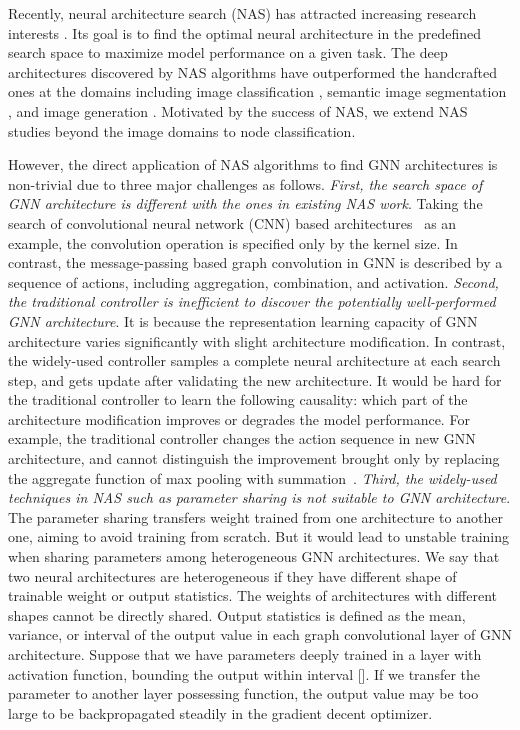 \documentclass[sigconf]{acmart}
\begin{document}
Recently, neural architecture search (NAS) has attracted increasing research interests \cite{elsken2018neural}. Its goal is to find the optimal neural architecture in the predefined search space to maximize model performance on a given task. The deep architectures discovered by NAS algorithms have outperformed the handcrafted ones at the domains including image classification \cite{zoph2016neural, zoph2018learning, liu2017hierarchical, pham2018efficient, jin2018auto, luo2018neural, liu2018progressive, liu2018darts, xie2019exploring, kandasamy2018neural}, semantic image segmentation \cite{liu2019auto}, and image generation \cite{wang2019agan}. Motivated by the success of NAS, we extend NAS studies beyond the image domains to node classification.


However, the direct application of NAS algorithms to find GNN architectures is non-trivial due to three major challenges as follows. {\textit{First, the search space of GNN architecture is different with the ones in existing NAS work}}.
Taking the search of convolutional neural network (CNN) based architectures~\cite{zoph2016neural} as an example, the convolution operation is specified only by the kernel size. In contrast, the message-passing based graph convolution in GNN is described by a sequence of actions, including aggregation, combination, and activation. 
{\textit{Second, the traditional controller is inefficient to discover the potentially well-performed GNN architecture}}. It is because the representation learning capacity of GNN architecture varies significantly with slight architecture modification. In contrast, the widely-used controller samples a complete neural architecture at each search step, and gets update after validating the new architecture. It would be hard for the traditional controller to learn the following causality: which part of the architecture modification improves or degrades the model performance. 
For example, the traditional controller changes the action sequence in new GNN architecture, and cannot distinguish the improvement brought only by replacing the aggregate function of max pooling with summation~\cite{howpowerful}.
{\textit{Third, the widely-used techniques in NAS such as parameter sharing is not suitable to GNN architecture}}. The parameter sharing transfers weight trained from one architecture to another one, aiming to avoid training from scratch. But it would lead to unstable training when sharing parameters among heterogeneous GNN architectures.
We say that two neural architectures are heterogeneous if they have different shape of trainable weight or output statistics. 
The weights of architectures with different shapes cannot be directly shared. Output statistics \cite{guo2019single} is defined as the mean, variance, or interval of the output value in each graph convolutional layer of GNN architecture. Suppose that we have parameters deeply trained in a layer with  activation function, bounding the output within interval []. If we transfer the parameter to another layer possessing  function, the output value may be too large to be backpropagated steadily in the gradient decent optimizer. 
\end{document}
